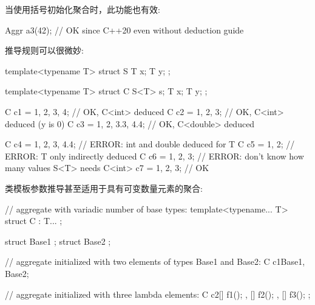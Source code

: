 当使用括号初始化聚合时，此功能也有效:

\begin{cpp}
Aggr a3(42); // OK since C++20 even without deduction guide
\end{cpp}

推导规则可以很微妙:

\begin{cpp}
template<typename T>
struct S {
	T x;
	T y;
};

template<typename T>
struct C {
	S<T> s;
	T x;
	T y;
};

C c1 = {{1, 2}, 3, 4}; // OK, C<int> deduced
C c2 = {{1, 2}, 3}; // OK, C<int> deduced (y is 0)
C c3 = {{1, 2}, 3.3, 4.4}; // OK, C<double> deduced

C c4 = {{1, 2}, 3, 4.4}; // ERROR: int and double deduced for T
C c5 = {{1, 2}}; // ERROR: T only indirectly deduced
C c6 = {1, 2, 3}; // ERROR: don’t know how many values S<T> needs
C<int> c7 = {1, 2, 3}; // OK
\end{cpp}

类模板参数推导甚至适用于具有可变数量元素的聚合:

\begin{cpp}
// aggregate with variadic number of base types:
template<typename... T>
struct C : T... {
};

struct Base1 {
};
struct Base2 {
};

// aggregate initialized with two elements of types Base1 and Base2:
C c1{Base1{}, Base2{}};

// aggregate initialized with three lambda elements:
C c2{[] { f1(); },
	[] { f2(); },
	[] { f3(); }
};
\end{cpp}
















